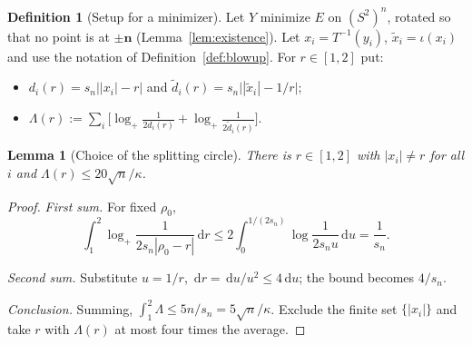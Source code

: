\documentclass[11pt]{article}
\newtheorem{lemma}[theorem]{Lemma}
\theoremstyle{definition}
\newtheorem{definition}[theorem]{Definition}
\theoremstyle{remark}
\newcommand{\dd}{\,\mathrm d}
\begin{document}
\begin{definition}[Setup for a minimizer]\label{def:LBsetup}
Let $Y$ minimize $E$ on $(S^2)^n$, rotated so that no point is at $\pm\mathbf n$
(Lemma~\ref{lem:existence}). Let $x_i=T^{-1}(y_i)$, $\tilde x_i=\iota(x_i)$ and use the notation of
Definition~\ref{def:blowup}. For $r\in[1,2]$ put:
\begin{itemize}[leftmargin=*]
\item $d_i(r)=s_n\bigl||x_i|-r\bigr|$ and $\tilde d_i(r)=s_n\bigl||\tilde x_i|-1/r\bigr|$;
\item $\Lambda(r):=\sum_i\bigl[\log_+\frac1{2d_i(r)}+\log_+\frac1{2\tilde d_i(r)}\bigr]$.
\end{itemize}
\end{definition}

\begin{lemma}[Choice of the splitting circle]\label{lem:choose-r}
There is $r\in[1,2]$ with $|x_i|\ne r$ for all $i$ and $\Lambda(r)\le20\sqrt n/\kappa$.
\end{lemma}
\begin{proof}
\emph{First sum.} For fixed $\rho_0$,
\[
\int_1^2\log_+\frac{1}{2s_n|\rho_0-r|}\dd r\le2\int_0^{1/(2s_n)}\log\frac1{2s_nu}\dd u=\frac1{s_n}.
\]

\emph{Second sum.} Substitute $u=1/r$, $\dd r=\dd u/u^2\le4\dd u$; the bound becomes $4/s_n$.

\emph{Conclusion.} Summing, $\int_1^2\Lambda\le5n/s_n=5\sqrt n/\kappa$. Exclude the finite set
$\{|x_i|\}$ and take $r$ with $\Lambda(r)$ at most four times the average.
\end{proof}
\end{document}
